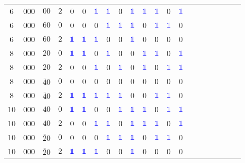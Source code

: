 \begin{longtable*}{c| cccccccccccccccccccc }
 6& 000& $00$& $2$& 0& 0& \textcolor{blue}{$\mathds{1}$}& \textcolor{blue}{$\mathds{1}$}& 0& \textcolor{blue}{$\mathds{1}$}& \textcolor{blue}{$\mathds{1}$}& \textcolor{blue}{$\mathds{1}$}& 0& \textcolor{blue}{$\mathds{1}$}\\
 6& 000& $60$& $0$& 0& 0& 0& \textcolor{blue}{$\mathds{1}$}& \textcolor{blue}{$\mathds{1}$}& \textcolor{blue}{$\mathds{1}$}& 0& \textcolor{blue}{$\mathds{1}$}& \textcolor{blue}{$\mathds{1}$}& 0\\
 6& 000& $60$& $2$& \textcolor{blue}{$\mathds{1}$}& \textcolor{blue}{$\mathds{1}$}& \textcolor{blue}{$\mathds{1}$}& 0& 0& \textcolor{blue}{$\mathds{1}$}& 0& 0& 0& 0\\
 8& 000& $20$& $0$& \textcolor{blue}{$\mathds{1}$}& \textcolor{blue}{$\mathds{1}$}& 0& \textcolor{blue}{$\mathds{1}$}& 0& 0& \textcolor{blue}{$\mathds{1}$}& \textcolor{blue}{$\mathds{1}$}& 0& \textcolor{blue}{$\mathds{1}$}\\
 8& 000& $20$& $2$& 0& 0& \textcolor{blue}{$\mathds{1}$}& 0& \textcolor{blue}{$\mathds{1}$}& 0& \textcolor{blue}{$\mathds{1}$}& 0& \textcolor{blue}{$\mathds{1}$}& \textcolor{blue}{$\mathds{1}$}\\
 8& 000& $\bar{4}0$& $0$& 0& 0& 0& 0& 0& 0& 0& 0& 0& 0\\
 8& 000& $\bar{4}0$& $2$& \textcolor{blue}{$\mathds{1}$}& \textcolor{blue}{$\mathds{1}$}& \textcolor{blue}{$\mathds{1}$}& \textcolor{blue}{$\mathds{1}$}& \textcolor{blue}{$\mathds{1}$}& 0& 0& \textcolor{blue}{$\mathds{1}$}& \textcolor{blue}{$\mathds{1}$}& 0\\
10& 000& $40$& $0$& \textcolor{blue}{$\mathds{1}$}& \textcolor{blue}{$\mathds{1}$}& 0& 0& \textcolor{blue}{$\mathds{1}$}& \textcolor{blue}{$\mathds{1}$}& \textcolor{blue}{$\mathds{1}$}& 0& \textcolor{blue}{$\mathds{1}$}& \textcolor{blue}{$\mathds{1}$}\\
10& 000& $40$& $2$& 0& 0& \textcolor{blue}{$\mathds{1}$}& \textcolor{blue}{$\mathds{1}$}& 0& \textcolor{blue}{$\mathds{1}$}& \textcolor{blue}{$\mathds{1}$}& \textcolor{blue}{$\mathds{1}$}& 0& \textcolor{blue}{$\mathds{1}$}\\
10& 000& $\bar{2}0$& $0$& 0& 0& 0& \textcolor{blue}{$\mathds{1}$}& \textcolor{blue}{$\mathds{1}$}& \textcolor{blue}{$\mathds{1}$}& 0& \textcolor{blue}{$\mathds{1}$}& \textcolor{blue}{$\mathds{1}$}& 0\\
10& 000& $\bar{2}0$& $2$& \textcolor{blue}{$\mathds{1}$}& \textcolor{blue}{$\mathds{1}$}& \textcolor{blue}{$\mathds{1}$}& 0& 0& \textcolor{blue}{$\mathds{1}$}& 0& 0& 0& 0\\

\end{longtable*}
